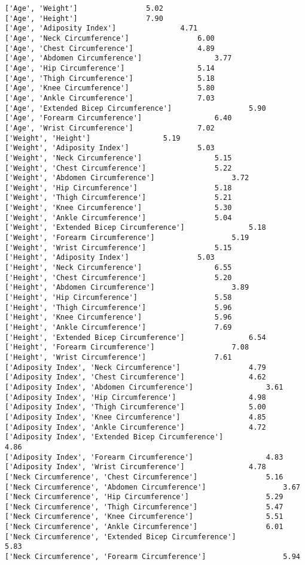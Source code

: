 \documentclass[11pt]{article}
\begin{document}
    \begin{Verbatim}[commandchars=\\\{\}]
['Age', 'Weight'] 				 5.02
['Age', 'Height'] 				 7.90
['Age', 'Adiposity Index'] 				 4.71
['Age', 'Neck Circumference'] 				 6.00
['Age', 'Chest Circumference'] 				 4.89
['Age', 'Abdomen Circumference'] 				 3.77
['Age', 'Hip Circumference'] 				 5.14
['Age', 'Thigh Circumference'] 				 5.18
['Age', 'Knee Circumference'] 				 5.80
['Age', 'Ankle Circumference'] 				 7.03
['Age', 'Extended Bicep Circumference'] 				 5.90
['Age', 'Forearm Circumference'] 				 6.40
['Age', 'Wrist Circumference'] 				 7.02
['Weight', 'Height'] 				 5.19
['Weight', 'Adiposity Index'] 				 5.03
['Weight', 'Neck Circumference'] 				 5.15
['Weight', 'Chest Circumference'] 				 5.22
['Weight', 'Abdomen Circumference'] 				 3.72
['Weight', 'Hip Circumference'] 				 5.18
['Weight', 'Thigh Circumference'] 				 5.21
['Weight', 'Knee Circumference'] 				 5.30
['Weight', 'Ankle Circumference'] 				 5.04
['Weight', 'Extended Bicep Circumference'] 				 5.18
['Weight', 'Forearm Circumference'] 				 5.19
['Weight', 'Wrist Circumference'] 				 5.15
['Height', 'Adiposity Index'] 				 5.03
['Height', 'Neck Circumference'] 				 6.55
['Height', 'Chest Circumference'] 				 5.20
['Height', 'Abdomen Circumference'] 				 3.89
['Height', 'Hip Circumference'] 				 5.58
['Height', 'Thigh Circumference'] 				 5.96
['Height', 'Knee Circumference'] 				 5.96
['Height', 'Ankle Circumference'] 				 7.69
['Height', 'Extended Bicep Circumference'] 				 6.54
['Height', 'Forearm Circumference'] 				 7.08
['Height', 'Wrist Circumference'] 				 7.61
['Adiposity Index', 'Neck Circumference'] 				 4.79
['Adiposity Index', 'Chest Circumference'] 				 4.62
['Adiposity Index', 'Abdomen Circumference'] 				 3.61
['Adiposity Index', 'Hip Circumference'] 				 4.98
['Adiposity Index', 'Thigh Circumference'] 				 5.00
['Adiposity Index', 'Knee Circumference'] 				 4.85
['Adiposity Index', 'Ankle Circumference'] 				 4.72
['Adiposity Index', 'Extended Bicep Circumference'] 				 4.86
['Adiposity Index', 'Forearm Circumference'] 				 4.83
['Adiposity Index', 'Wrist Circumference'] 				 4.78
['Neck Circumference', 'Chest Circumference'] 				 5.16
['Neck Circumference', 'Abdomen Circumference'] 				 3.67
['Neck Circumference', 'Hip Circumference'] 				 5.29
['Neck Circumference', 'Thigh Circumference'] 				 5.47
['Neck Circumference', 'Knee Circumference'] 				 5.51
['Neck Circumference', 'Ankle Circumference'] 				 6.01
['Neck Circumference', 'Extended Bicep Circumference'] 				 5.83
['Neck Circumference', 'Forearm Circumference'] 				 5.94

\end{Verbatim}
\end{document}
